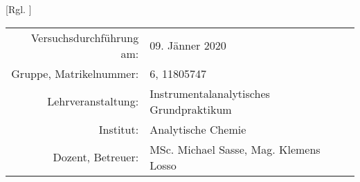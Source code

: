 [Rgl. ]{}{}
  
\maketitle %
  
\begin{center}
  \begin{tabular}{r p{4cm}}
    Versuchsdurchführung am: & 09. Jänner 2020\\ %
    Gruppe, Matrikelnummer: & 6, 11805747 \\
    Lehrveranstaltung: & Instrumentalanalytisches Grundpraktikum \\
    Institut: & Analytische Chemie \\
    Dozent, Betreuer: & MSc. Michael Sasse, Mag. Klemens Losso %
  \end{tabular}
\end{center}

\begin{abstract}
  
\end{abstract}